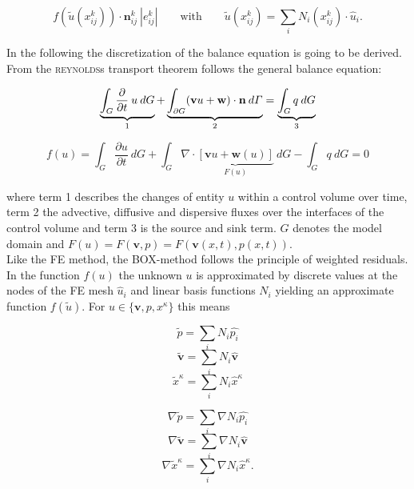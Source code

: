 \begin{equation}
 	f(\tilde u(x^k_{ij})) \cdot \mathbf n^k_{ij} \: |e^k_{ij}| \qquad \textrm{with} \qquad \tilde u(x^k_{ij}) = \sum_i N_i(x^k_{ij}) \cdot \hat u_i .
\end{equation}

In the following the discretization of the balance equation is going to be derived. From the \textsc{reynolds}s transport theorem follows the general balance equation:

\begin{equation}
	\underbrace{\int_G \frac{\partial}{\partial t} \: u \: dG}_{1} + \underbrace{\int_{\partial G} (\mathbf{v} u + \mathbf w) \cdot \textbf n \: d\varGamma}_{2} = \underbrace{\int_G q \: dG}_{3}
\end{equation}

\begin{equation}
	f(u) = \int_G \frac{\partial u}{\partial t} \: dG + \int_{G} \nabla \cdot \underbrace{\left[  \mathbf{v} u + \mathbf w(u)\right] }_{F(u)}  \: dG - \int_G q \: dG = 0
\end{equation}
 
where term 1 describes the changes of entity $u$ within a control volume over time, term 2 the advective, diffusive and dispersive fluxes over the interfaces of the control volume and term 3 is the source and sink term. $G$ denotes the model domain and $F(u) = F(\mathbf v, p) = F(\mathbf v(x,t), p(x,t))$.\\

Like the FE method, the BOX-method follows the principle of weighted residuals. In the function $f(u)$ the unknown $u$ is approximated by discrete values at the nodes of the FE mesh $\hat u_i$ and linear basis functions $N_i$ yielding an approximate function $f(\tilde u)$. For $u\in \lbrace \mathbf v, p, x^\kappa \rbrace$ this means

\begin{minipage}[b]{0.5\textwidth}
\begin{equation}
\label{eq:p} 
	\tilde p = \sum_i N_i \hat{p_i}
\end{equation}
\begin{equation}
\label{eq:v} 
	\tilde{\mathbf v} = \sum_i N_i \hat{\mathbf v}
\end{equation}
\begin{equation}
\label{eq:x} 
	\tilde x^\kappa  = \sum_i N_i \hat x^\kappa 
\end{equation}
\end{minipage}
\hfill
\begin{minipage}[b]{0.5\textwidth}
\begin{equation}
\label{eq:dp} 
	\nabla \tilde p = \sum_i \nabla N_i \hat{p_i}
\end{equation}
\begin{equation}
\label{eq:dv} 
	\nabla \tilde{\mathbf v} = \sum_i \nabla N_i \hat{\mathbf v}
\end{equation}
\begin{equation}
\label{eq:dx} 
	\nabla \tilde x^\kappa  = \sum_i \nabla N_i \hat x^\kappa .
\end{equation}
\end{minipage} 

